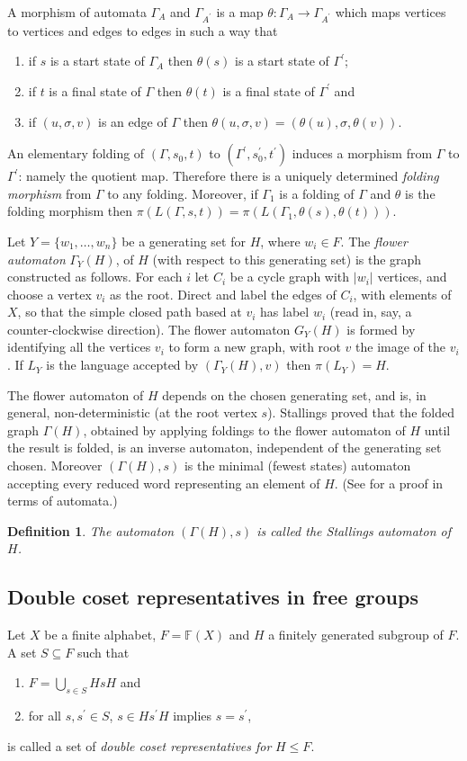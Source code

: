 \documentclass[a4paper,12pt]{article}
\newcommand{\G}{\Gamma }
\newtheorem{definition}[theorem]{Definition}
\numberwithin{equation}{section}
\numberwithin{figure}{section}
\newcommand{\FF}{\ensuremath{\mathbb{F}}}
\newcommand{\maps}{\rightarrow}
\newcommand{\be}{\begin{enumerate}}
\newcommand{\ee}{\end{enumerate}}
\begin{document}
A morphism of automata $\G_A$ and $\G_{A^\prime}$ is a map
$\theta: \G_A\maps \G_{A^\prime}$ which maps vertices to vertices and
edges to edges in such a way that
\be \item if $s$ is a start state  of
$\G_A$ then $\theta(s)$ is a start state of $\G^\prime$;
\item if $t$ is a final state of $\G$ then $\theta(t)$ is a final state of
$\G^\prime$ and
\item  if
$(u,\sigma,v)$ is an edge of $\G$ then
$\theta(u,\sigma,v)=(\theta(u),\sigma,\theta(v))$. \ee An
elementary folding of  $(\G,s_0,t)$ to $(\G^\prime,s^\prime_0,
t^\prime)$ induces a morphism from $\G$ to $\G^\prime$: namely the
quotient map. Therefore there is
 a uniquely determined {\em folding morphism}  from $\G$ to any folding. Moreover, if $\G_1$
is a folding of $\G$ and $\theta$ is the folding morphism then
$\pi(L(\G,s,t))= \pi(L(\G_1,\theta(s),\theta(t)))$.




Let $Y=\{w_1,\ldots ,w_n\}$ be a generating set for $H$, where $w_i\in F$.
The {\em flower automaton} $\G_Y(H)$, of $H$ (with respect to this generating set)
is the graph constructed as follows. For each $i$ let $C_i$ be a cycle
graph with $|w_i|$ vertices, and choose a vertex $v_i$ as the root. Direct
and label the edges of $C_i$, with elements of $X$,
so that the simple closed path based at $v_i$ has
label $w_i$ (read in, say, a counter-clockwise direction). The flower
automaton $G_Y(H)$ is formed by identifying all the vertices $v_i$ to form
a new graph, with root $v$ the image of the $v_i$. If $L_Y$ is the language  accepted
by $(\G_Y(H), v)$ then $\pi(L_Y)=H$.


The flower automaton of $H$ depends on the chosen generating set, and is,
in general,
non-deterministic (at the root vertex $s$). Stallings \cite{stallings83}
proved that the folded graph $\G(H)$, obtained by applying foldings to the
flower automaton of $H$ until the result is folded, is an inverse
automaton, independent of the generating set chosen.
Moreover  $(\G(H),s)$ is the minimal (fewest states) automaton accepting
every reduced word representing an element of $H$. (See \cite{BartholdiSilva}
for a proof in terms of automata.)
\begin{definition}
The automaton $(\G(H),s)$ is  called the {\em Stallings automaton} of $H$.
\end{definition}
\subsection{Double coset representatives in free groups}\label{sub:2cosetrepr}
Let $X$ be a finite alphabet, $F=\FF(X)$ and $H$ a finitely generated subgroup
of $F$.
A  set $S\subseteq F$ such that
\be
\item
$F = \displaystyle{\bigcup_{s \in S} HsH}$
and
\item
for all $s, s^\prime \in S$, $s\in H s^\prime H$
implies $s=s^\prime$,
\ee
is called a set of \emph{double coset representatives for} $H\le F$.
\end{document}
